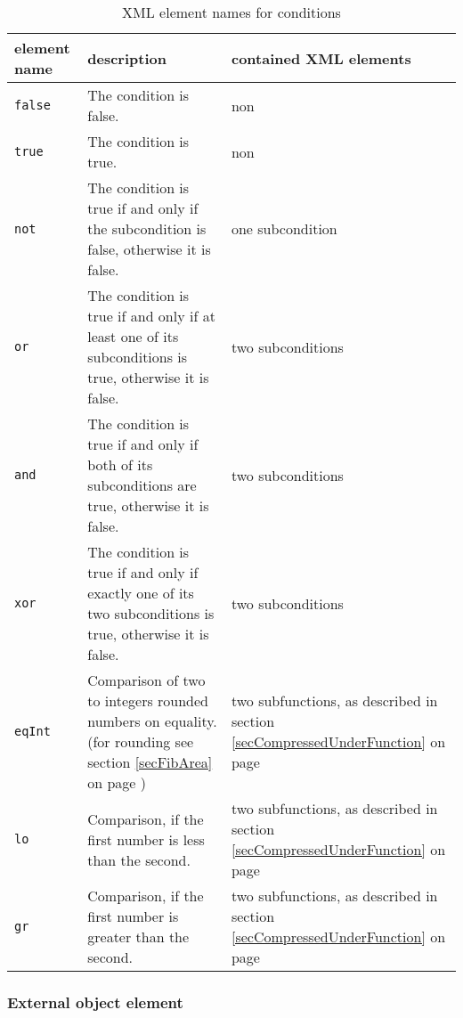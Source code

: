 \begin{table}[htbp]
\begin{center}
\begin{tabular}{|p{15mm}|p{60mm}|p{40mm}|}\hline
	ele\-ment name & description & contained XML elements \\\hline\hline
	\verb|false| & The condition is false. & non \\\hline
	\verb|true| & The condition is true. & non \\\hline
	\verb|not| & The condition is true if and only if the subcondition is false, otherwise it is false. & one subcondition \\\hline
	\verb|or|  & The condition is true if and only if at least one of its subconditions is true, otherwise it is false. & two subconditions \\\hline
	\verb|and| & The condition is true if and only if both of its subconditions are true, otherwise it is false. & two subconditions \\\hline
	\verb|xor| & The condition is true if and only if exactly one of its two subconditions is true, otherwise it is false. & two subconditions \\\hline

	\verb|eqInt| & Comparison of two to integers rounded numbers on equality. (for rounding see section \ref{secFibArea} on page \pageref{secFibArea}) & two subfunctions, as described in section \ref{secCompressedUnderFunction} on page \pageref{secCompressedUnderFunction}\\\hline
	\verb|lo| & Comparison, if the first number is less than the second. & two subfunctions, as described in section \ref{secCompressedUnderFunction} on page \pageref{secCompressedUnderFunction} \\\hline
	\verb|gr| & Comparison, if the first number is greater than the second. & two subfunctions, as described in section \ref{secCompressedUnderFunction} on page \pageref{secCompressedUnderFunction} \\\hline

\end{tabular} 
\end{center}
\caption{XML element names for conditions}
\label{tableXmlConditions}
\end{table}



\subsubsection{External object element}

